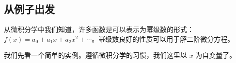 


\subsection{从例子出发}

从微积分学中我们知道，许多函数是可以表示为幂级数的形式：$f(x)=a_0+a_1x+a_2x^2+\cdots$。幂级数良好的性质可以用于解二阶微分方程。

我们先看一个简单的实例。遵循微积分学的习惯，我们这里以 $x$ 为自变量了。

